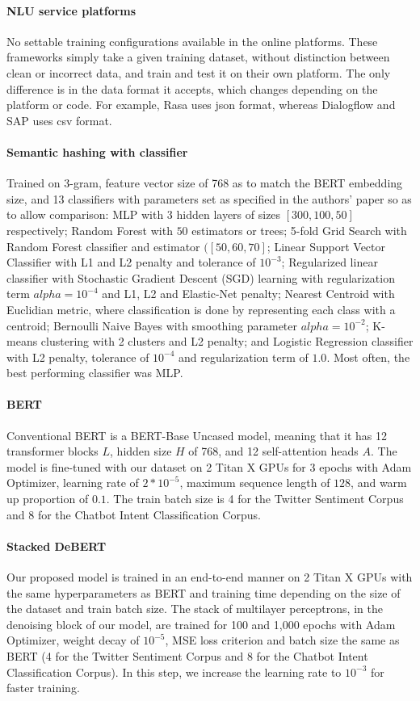 \documentclass[review]{elsarticle}
\begin{document}
\paragraph{NLU service platforms} No settable training configurations available in the online platforms. These frameworks simply take a given training dataset, without distinction between clean or incorrect data, and train and test it on their own platform. The only difference is in the data format it accepts, which changes depending on the platform or code. For example, Rasa uses json format, whereas Dialogflow and SAP uses csv format.

\paragraph{Semantic hashing with classifier} Trained on 3-gram, feature vector size of 768 as to match the BERT embedding size, and 13 classifiers with parameters set as specified in the authors' paper so as to allow comparison: MLP with 3 hidden layers of sizes $[300, 100, 50]$ respectively; Random Forest with $50$ estimators or trees; 5-fold Grid Search with Random Forest classifier and estimator $([50, 60, 70]$; Linear Support Vector Classifier with L1 and L2 penalty and tolerance of $10^{-3}$; Regularized linear classifier with Stochastic Gradient Descent (SGD) learning with regularization term $alpha=10^{-4}$ and L1, L2 and Elastic-Net penalty; Nearest Centroid with Euclidian metric, where classification is done by representing each class with a centroid; Bernoulli Naive Bayes with smoothing parameter $alpha=10^{-2}$; K-means clustering with 2 clusters and L2 penalty; and Logistic Regression classifier with L2 penalty, tolerance of $10^{-4}$ and regularization term of $1.0$. Most often, the best performing classifier was MLP. 

\paragraph{BERT} Conventional BERT is a BERT-Base Uncased model, meaning that it has 12 transformer blocks $L$, hidden size $H$ of 768, and 12 self-attention heads $A$. The model is fine-tuned with our dataset on 2 Titan X GPUs for 3 epochs with Adam Optimizer, learning rate of $2*10^{-5}$, maximum sequence length of $128$, and warm up proportion of $0.1$. The train batch size is 4 for the Twitter Sentiment Corpus and 8 for the Chatbot Intent Classification Corpus. 

\paragraph{Stacked DeBERT} Our proposed model is trained in an end-to-end manner on 2 Titan X GPUs with the same hyperparameters as BERT and training time depending on the size of the dataset and train batch size. The stack of multilayer perceptrons, in the denoising block of our model, are trained for 100 and 1,000 epochs with Adam Optimizer, weight decay of $10^{-5}$, MSE loss criterion and batch size the same as BERT (4 for the Twitter Sentiment Corpus and 8 for the Chatbot Intent Classification Corpus). In this step, we increase the learning rate to $10^{-3}$ for faster training.
\end{document}
